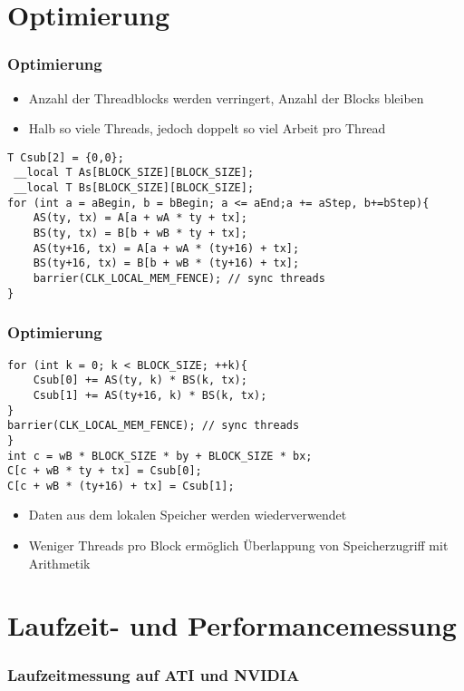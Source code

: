 \documentclass{beamer}
\begin{document}
\section{Optimierung}
\begin{frame}[fragile]
\frametitle{Optimierung}

\begin{itemize}
\item
Anzahl der Threadblocks werden verringert, Anzahl der Blocks bleiben
\item
Halb so viele Threads, jedoch doppelt so viel Arbeit pro Thread
\end{itemize}


\begin{lstlisting}[style=customc,caption=Optimized Code in OpenCL]
T Csub[2] = {0,0};
 __local T As[BLOCK_SIZE][BLOCK_SIZE]; 
 __local T Bs[BLOCK_SIZE][BLOCK_SIZE]; 
for (int a = aBegin, b = bBegin; a <= aEnd;a += aStep, b+=bStep){ 
	AS(ty, tx) = A[a + wA * ty + tx]; 
	BS(ty, tx) = B[b + wB * ty + tx]; 
	AS(ty+16, tx) = A[a + wA * (ty+16) + tx]; 
	BS(ty+16, tx) = B[b + wB * (ty+16) + tx]; 
	barrier(CLK_LOCAL_MEM_FENCE); // sync threads
}
\end{lstlisting}



\end{frame}


\begin{frame}[fragile]
\frametitle{Optimierung}
\begin{lstlisting}[style=customc,caption=innere Schleife und Output]
for (int k = 0; k < BLOCK_SIZE; ++k){ 
	Csub[0] += AS(ty, k) * BS(k, tx); 
	Csub[1] += AS(ty+16, k) * BS(k, tx); 
} 
barrier(CLK_LOCAL_MEM_FENCE); // sync threads
} 
int c = wB * BLOCK_SIZE * by + BLOCK_SIZE * bx; 
C[c + wB * ty + tx] = Csub[0]; 
C[c + wB * (ty+16) + tx] = Csub[1]; 
\end{lstlisting}

\begin{itemize}

\item
Daten aus dem lokalen Speicher werden wiederverwendet
\item 
Weniger Threads pro Block erm\"oglich \"Uberlappung von Speicherzugriff mit Arithmetik
\end{itemize}


\end{frame}

\section{Laufzeit- und Performancemessung}
\begin{frame}
\frametitle{Laufzeitmessung auf ATI und NVIDIA}
\end{frame}
\end{document}
